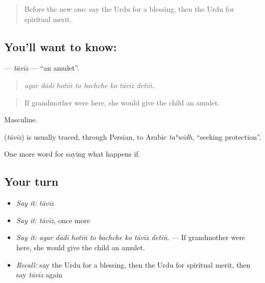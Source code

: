 \label{lesson:UR-C528-taviz}



\begin{quote}
Before the new one: say the Urdu for a blessing, then the Urdu for spiritual merit.
\end{quote}

\subsection*{You'll want to know: }
\textbf{} — \emph{tāvīz} — \textquotedblleft{}an amulet\textquotedblright{}.

\begin{quote}
       
\end{quote}

\begin{quote}
\emph{agar dādī hotīṅ to bachche ko tāvīz detīṅ.}
\end{quote}

\begin{quote}
If grandmother were here, she would give the child an amulet.
\end{quote}

Masculine.

\begin{cousinweb}
\textbf{} (\emph{tāvīz}) is usually traced, through Persian, to Arabic \emph{taʿwīdh}, \textquotedblleft{}seeking protection\textquotedblright{}.
\end{cousinweb}

\begin{grammarlens}[title={What you've built}]
One more word for saying what happens if.
\end{grammarlens}

\subsection*{Your turn}
\begin{itemize}
\raggedright
  \item \emph{Say it:} \emph{tāvīz}
  \item \emph{Say it:} \emph{tāvīz}, once more
  \item \emph{Say it:} \emph{agar dādī hotīṅ to bachche ko tāvīz detīṅ.} — If grandmother were here, she would give the child an amulet.
  \item \emph{Recall:} say the Urdu for a blessing, then the Urdu for spiritual merit, then say \emph{tāvīz} again
\end{itemize}

